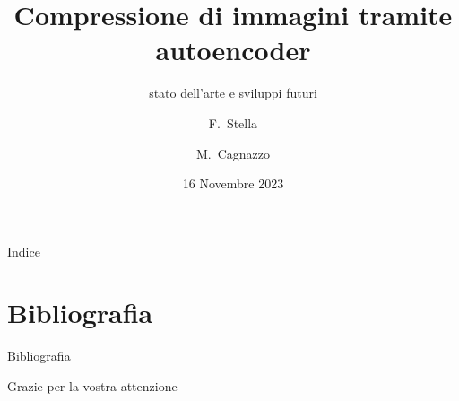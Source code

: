 \documentclass{beamer}
\title{Compressione di immagini tramite autoencoder}
\subtitle{stato dell’arte e sviluppi futuri}
\author[Filippo Stella, Marco Cagnazzo]{F.~Stella \and M.~Cagnazzo}
\date{16 Novembre 2023}
\begin{document}
\frame{\titlepage}

\begin{frame}{Indice}
    \tableofcontents    
\end{frame}


    




\section{Bibliografia}
    
\begin{frame}[allowframebreaks]{Bibliografia}
    \printbibliography
\end{frame}
    
\begin{frame}{\:}
    \begin{center}
        \large Grazie per la vostra attenzione 
    \end{center}
\end{frame}
    
\end{document}

